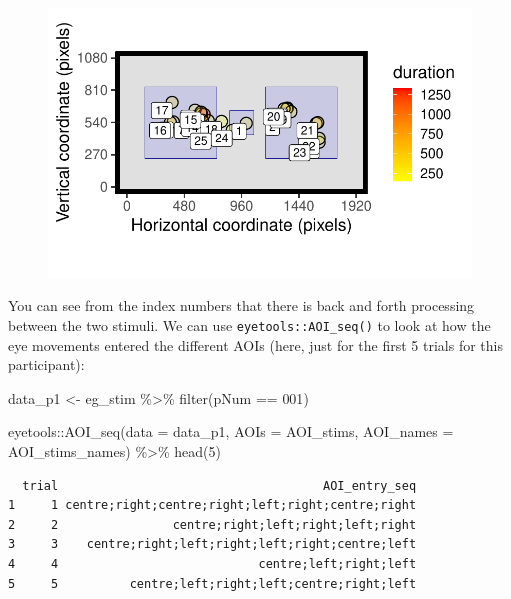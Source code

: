 \documentclass[
  letterpaper,
  DIV=11,
  numbers=noendperiod]{scrartcl}
\newenvironment{Shaded}{\begin{snugshade}}{\end{snugshade}}
\newcommand{\AttributeTok}[1]{\textcolor[rgb]{0.40,0.45,0.13}{#1}}
\newcommand{\DecValTok}[1]{\textcolor[rgb]{0.68,0.00,0.00}{#1}}
\newcommand{\FunctionTok}[1]{\textcolor[rgb]{0.28,0.35,0.67}{#1}}
\newcommand{\NormalTok}[1]{\textcolor[rgb]{0.00,0.23,0.31}{#1}}
\newcommand{\OtherTok}[1]{\textcolor[rgb]{0.00,0.23,0.31}{#1}}
\newcommand{\SpecialCharTok}[1]{\textcolor[rgb]{0.37,0.37,0.37}{#1}}
\begin{document}
\begin{figure}[H]

{\centering \includegraphics{inj_unsw_report_files/figure-pdf/unnamed-chunk-3-1.pdf}

}

\end{figure}

You can see from the index numbers that there is back and forth
processing between the two stimuli. We can use
\texttt{eyetools::AOI\_seq()} to look at how the eye movements entered
the different AOIs (here, just for the first 5 trials for this
participant):

\begin{Shaded}
\begin{Highlighting}[]
\NormalTok{data\_p1 }\OtherTok{\textless{}{-}} 
\NormalTok{  eg\_stim }\SpecialCharTok{\%\textgreater{}\%} 
  \FunctionTok{filter}\NormalTok{(pNum }\SpecialCharTok{==} \DecValTok{001}\NormalTok{)}

\NormalTok{eyetools}\SpecialCharTok{::}\FunctionTok{AOI\_seq}\NormalTok{(}\AttributeTok{data =}\NormalTok{ data\_p1, }\AttributeTok{AOIs =}\NormalTok{ AOI\_stims, }\AttributeTok{AOI\_names =}\NormalTok{ AOI\_stims\_names) }\SpecialCharTok{\%\textgreater{}\%} 
  \FunctionTok{head}\NormalTok{(}\DecValTok{5}\NormalTok{)}
\end{Highlighting}
\end{Shaded}

\begin{verbatim}
  trial                                     AOI_entry_seq
1     1 centre;right;centre;right;left;right;centre;right
2     2                centre;right;left;right;left;right
3     3    centre;right;left;right;left;right;centre;left
4     4                            centre;left;right;left
5     5          centre;left;right;left;centre;right;left
\end{verbatim}
\end{document}
